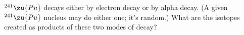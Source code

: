 $^{241}\zu{Pu}$ decays either by electron decay or by alpha
decay. (A given $^{241}\zu{Pu}$ nucleus may do either one; it's random.)
What are the isotopes created as products of these two modes
of decay?
